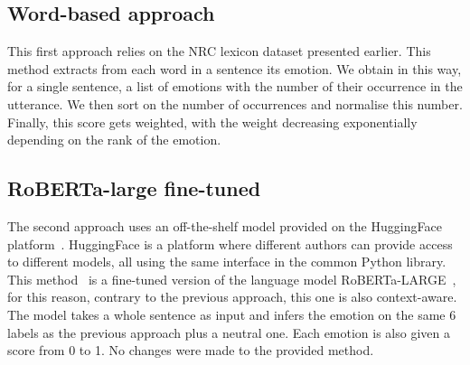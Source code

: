 \documentclass[nomenclature, english, biblatex]{kththesis}
\begin{document}
\subsection{Word-based approach}
This first approach relies on the NRC lexicon dataset presented earlier. This method extracts from each word in a sentence its emotion. We obtain in this way, for a single sentence, a list of emotions with the number of their occurrence in the utterance. We then sort on the number of occurrences and normalise this number. Finally, this score gets weighted, with the weight decreasing exponentially depending on the rank of the emotion.
\subsection{RoBERTa-large fine-tuned}
The second approach uses an off-the-shelf model provided on the HuggingFace platform~\cite{wolf-etal-2020-transformers}. HuggingFace is a platform where different authors can provide access to different models, all using the same interface in the common Python library. This method~\cite{hartmann2022emotionenglish} is a fine-tuned version of the language model RoBERTa-LARGE~\cite{liu2019roberta}, for this reason, contrary to the previous approach, this one is also context-aware. The model takes a whole sentence as input and infers the emotion on the same 6 labels as the previous approach plus a neutral one. Each emotion is also given a score from 0 to 1. No changes were made to the provided method.
\end{document}
